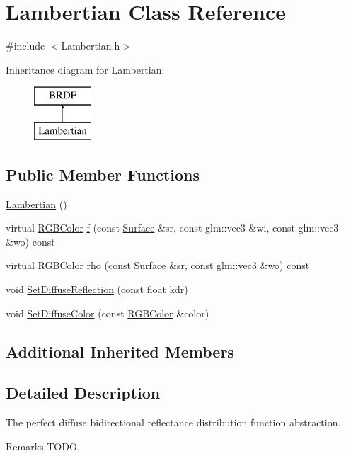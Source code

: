\hypertarget{class_lambertian}{}\section{Lambertian Class Reference}
\label{class_lambertian}


{\ttfamily \#include $<$Lambertian.\+h$>$}

Inheritance diagram for Lambertian\+:\begin{figure}[H]
\begin{center}
\leavevmode
\includegraphics[height=2.000000cm]{class_lambertian}
\end{center}
\end{figure}
\subsection*{Public Member Functions}
\begin{DoxyCompactItemize}
\item 
\hyperlink{class_lambertian_a9a6eb485fd890f0873ed144ed8cbbfb2}{Lambertian} ()
\item 
virtual \hyperlink{class_r_g_b_color}{R\+G\+B\+Color} \hyperlink{group___b_r_d_f_gad7b8c290aaacbe6c11ee62529dd7389b}{f} (const \hyperlink{class_surface}{Surface} \&sr, const glm\+::vec3 \&wi, const glm\+::vec3 \&wo) const
\item 
virtual \hyperlink{class_r_g_b_color}{R\+G\+B\+Color} \hyperlink{group___b_r_d_f_gaa70272886cbeb0f91c629ace938dd0a0}{rho} (const \hyperlink{class_surface}{Surface} \&sr, const glm\+::vec3 \&wo) const
\item 
void \hyperlink{group___b_r_d_f_ga4d1bf71e27d8eacc273d244e01fe2d46}{Set\+Diffuse\+Reflection} (const float kdr)
\item 
void \hyperlink{group___b_r_d_f_gadd1e0590ffcada37b485b985182439de}{Set\+Diffuse\+Color} (const \hyperlink{class_r_g_b_color}{R\+G\+B\+Color} \&color)
\end{DoxyCompactItemize}
\subsection*{Additional Inherited Members}


\subsection{Detailed Description}
The perfect diffuse bidirectional reflectance distribution function abstraction. \begin{DoxyRemark}{Remarks}
T\+O\+DO. 
\end{DoxyRemark}


